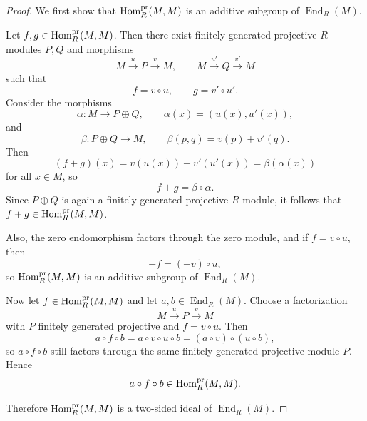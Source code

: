 \begin{proof}
    We first show that $\mathrm{Hom}_R^{\operatorname{pr}}(M,M)$ is an additive subgroup of $\operatorname{End}_R(M)$.

    Let $f,g\in \mathrm{Hom}_R^{\operatorname{pr}}(M,M)$. Then there exist finitely generated
    projective $R$-modules $P,Q$ and morphisms
    \[
        M \xrightarrow{\,u\,} P \xrightarrow{\,v\,} M,
        \qquad
        M \xrightarrow{\,u'\,} Q \xrightarrow{\,v'\,} M
    \]
    such that
    \[
        f=v\circ u,\qquad g=v'\circ u'.
    \]
    Consider the morphisms
    \[
        \alpha:M\to P\oplus Q,\qquad \alpha(x)=(u(x),u'(x)),
    \]
    and
    \[
        \beta:P\oplus Q\to M,\qquad \beta(p,q)=v(p)+v'(q).
    \]
    Then
    \[
        (f+g)(x)=v(u(x))+v'(u'(x))=\beta(\alpha(x))
    \]
    for all $x\in M$, so
    \[
        f+g=\beta\circ\alpha.
    \]
    Since $P\oplus Q$ is again a finitely generated projective $R$-module, it follows that $f+g\in \mathrm{Hom}_R^{\operatorname{pr}}(M,M)$.

    Also, the zero endomorphism factors through the zero module, and if $f=v\circ u$, then
    \[
        -f=(-v)\circ u,
    \]
    so $\mathrm{Hom}_R^{\operatorname{pr}}(M,M)$ is an additive subgroup of $\operatorname{End}_R(M)$.

    Now let $f\in \mathrm{Hom}_R^{\operatorname{pr}}(M,M)$ and let $a,b\in \operatorname{End}_R(M)$. Choose a
    factorization
    \[
        M\xrightarrow{\,u\,} P \xrightarrow{\,v\,} M
    \]
    with $P$ finitely generated projective and $f=v\circ u$. Then
    \[
        a\circ f\circ b
        =a\circ v\circ u\circ b
        =(a\circ v)\circ (u\circ b),
    \]
    so $a\circ f\circ b$ still factors through the same finitely generated projective
    module $P$. Hence
    \[
        a\circ f\circ b\in \mathrm{Hom}_R^{\operatorname{pr}}(M,M).
    \]

    Therefore $\mathrm{Hom}_R^{\operatorname{pr}}(M,M)$ is a two-sided ideal of $\operatorname{End}_R(M)$.
\end{proof}

